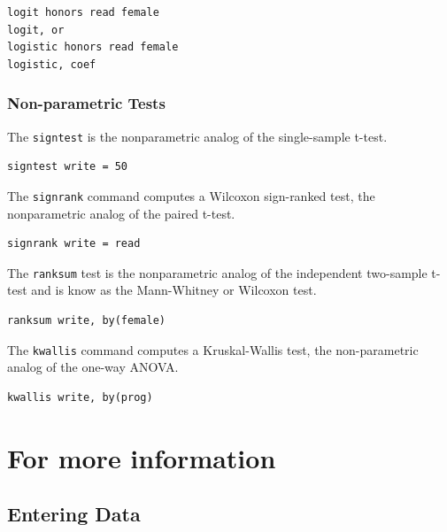 \documentclass{article}
\begin{document}
\begin{lstlisting}
logit honors read female
logit, or
logistic honors read female
logistic, coef
\end{lstlisting}

\subsubsection{Non-parametric Tests}

The \lstinline{signtest} is the nonparametric analog of the single-sample t-test.

\begin{lstlisting}
signtest write = 50
\end{lstlisting}

The \lstinline{signrank} command computes a Wilcoxon sign-ranked test, the nonparametric analog of the paired t-test.

\begin{lstlisting}
signrank write = read
\end{lstlisting}

The \lstinline{ranksum} test is the nonparametric analog of the independent two-sample t-test and is know as the Mann-Whitney or Wilcoxon test.

\begin{lstlisting}
ranksum write, by(female)
\end{lstlisting}

The \lstinline{kwallis} command computes a Kruskal-Wallis test, the non-parametric analog of the one-way ANOVA.

\begin{lstlisting}
kwallis write, by(prog)
\end{lstlisting}

\section{For more information}

\subsection{Entering Data}
\end{document}
